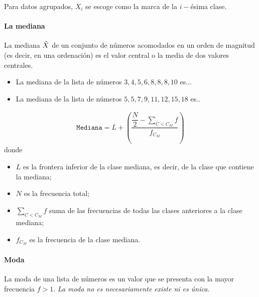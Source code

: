 \begin{observacion}
	
	Para datos agrupados, $X_{i}$ se escoge como la marca de la $i-$ésima clase.
\end{observacion}


\paragraph{La mediana}
La mediana $\tilde{X}$ de un conjunto de números acomodados en un orden de magnitud (es decir, en una ordenación) es el valor central o la media de dos valores centrales.


\begin{ejemplo}
	\begin{itemize}
		\item La mediana de la lista de números $3,4,5,6,8,8,8,10$ es... 
		\item La mediana de la lista de números $5,5,7,9,11,12,15,18$ es..
	\end{itemize}
	
\end{ejemplo}



\begin{definicion}
	\begin{align}
		\texttt{Mediana}=L+\left(
		\dfrac{ \dfrac{N}{2}-\sum_{{C<C_{M}}}f}{f_{C_{M}}}
		\right)
	\end{align}
	donde 
	\begin{itemize}
		\item $L$ es la frontera inferior de la clase mediana, es decir, de la clase que contiene la mediana;
		\item $N$ es la frecuencia total; 
		\item $\sum_{{C<C_{M}}}f$ suma de las frecuencias de todas las clases anteriores a la clase mediana; 
		\item $f_{C_{M}}$ es la frecuencia de la clase mediana.
	\end{itemize}
	
\end{definicion}


\paragraph{Moda}
La moda de una lista de números es un valor que se presenta con la mayor frecuencia $f>1$.  \emph{La moda no es necesariamente existe ni es única.}


